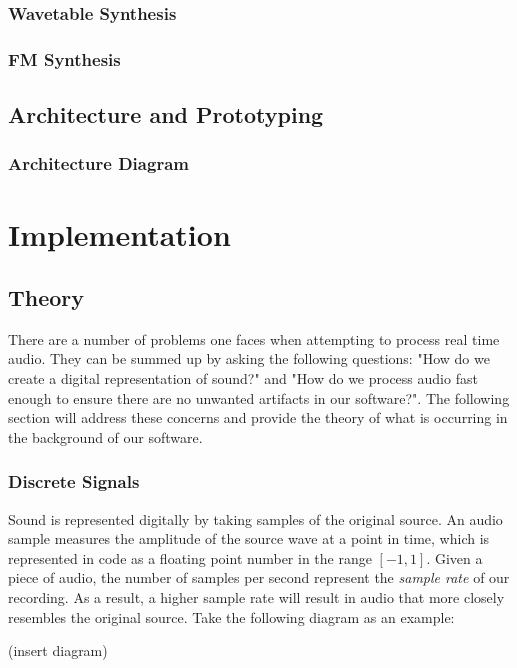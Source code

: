 \documentclass[12pt]{article}
\begin{document}
\subsubsection*{Wavetable Synthesis}

\subsubsection*{FM Synthesis}

\subsection{Architecture and Prototyping}

\subsubsection{Architecture Diagram}

\section{Implementation}

\subsection{Theory}
There are a number of problems one faces when attempting to process real time audio. They can be summed up by asking the following questions: "How do we create a digital representation of sound?" and "How do we process audio fast enough to ensure there are no unwanted artifacts in our software?". The following section will address these concerns and provide the theory of what is occurring in the background of our software.

\subsubsection{Discrete Signals}
Sound is represented digitally by taking samples of the original source. An audio sample measures the amplitude of the source wave at a point in time, which is represented in code as a floating point number in the range \([-1, 1]\). Given a piece of audio, the number of samples per second represent the \textit{sample rate} of our recording. As a result, a higher sample rate will result in audio that more closely resembles the original source. Take the following diagram as an example:

(insert diagram)
\end{document}
